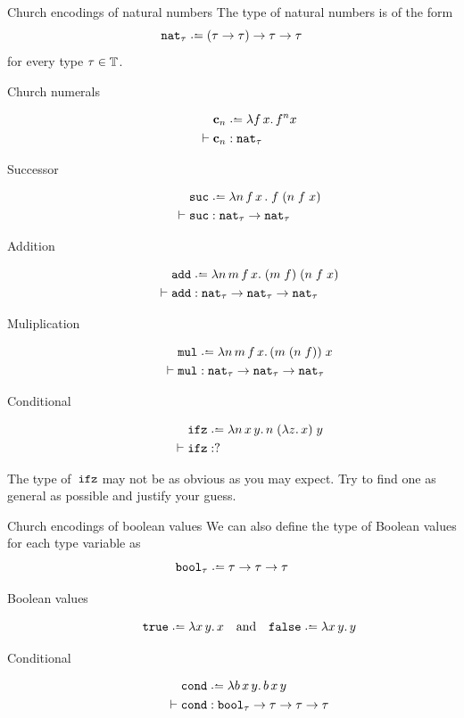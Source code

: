 \begin{frame}[allowframebreaks]{Church encodings of natural numbers}
The type of natural numbers is of the form
\[
  \nat_\tau \defeq (\tau \to \tau) \to \tau \to \tau
\]
for every type $\tau \in \mathbb{T}$.
  
  \begin{description}
    \item[Church numerals]
      \begin{align*}
        & \bc_n \defeq \lambda f\,x.\,
        f^n x \\
        \vdash{} & \bc_n : \nat_\tau
      \end{align*}
    \item[Successor]
      \begin{align*}
        & \suc \defeq \lambda n \,f\,x\,.\;f\;(n\;f\;x) \\
        \vdash{} & \suc : \nat_\tau \to \nat_\tau
      \end{align*}
    \item[Addition]
      \begin{align*}
        & \add \defeq \lambda n\,m\,f\,x.\; (m\;f)\;(n\;f\;x) \\
        \vdash{} & \add : \nat_\tau \to \nat_\tau \to \nat_\tau
      \end{align*}
    \item[Muliplication] 
      \begin{align*}
        & \mul \defeq \lambda n\,m\,f\,x.\, (m\;(n\;f))\;x\\
      \vdash{} & \mul : \nat_\tau \to \nat_\tau \to \nat_\tau
      \end{align*}
    \item[Conditional]
      \begin{align*}
        & \ifz \defeq \lambda n\,x\,y.\, n\;(\lambda z.\, x)\;y\\
        \vdash {} & \ifz : ?
      \end{align*}
  \end{description}
The type of~$\mathtt{ifz}$ may not be as obvious as you may expect.
Try to find one as general as possible and justify your guess.

\end{frame}
\begin{frame}{Church encodings of boolean values}
We can also define the type of Boolean values 
for each type variable as
\[
  \bool_\tau \defeq \tau \to \tau \to \tau
\]
\begin{description}
  \item[Boolean values]
      \[
        \true \defeq \lambda x\,y.\,x 
        \quad\text{and}\quad
        \false \defeq \lambda x\,y.\,y 
      \]
  \item[Conditional]
    \begin{align*}
      & \cond \defeq \lambda b\,x\,y.\, b\,x\,y\\
      \vdash {} & \cond : \bool_{\tau} \to \tau \to \tau \to \tau
    \end{align*}
\end{description}
\end{frame}

